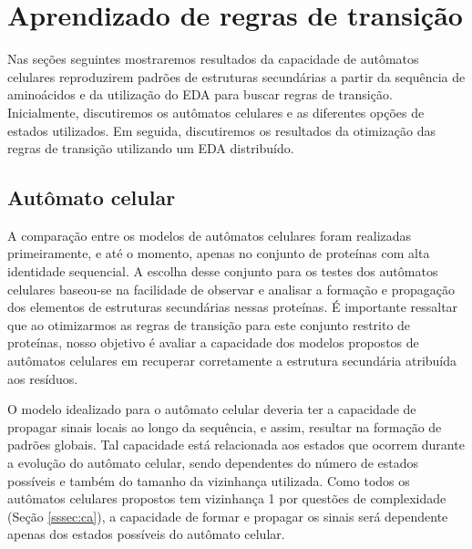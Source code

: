 \chapter{Aprendizado de regras de transição}

Nas seções seguintes mostraremos resultados da capacidade de autômatos celulares reproduzirem padrões de estruturas secundárias a partir da sequência de aminoácidos e da utilização do EDA para buscar regras de transição. Inicialmente, discutiremos os autômatos celulares e as diferentes opções de estados utilizados. Em seguida, discutiremos os resultados da otimização das regras de transição utilizando um EDA distribuído.  


\section{Autômato celular}

A comparação entre os modelos de autômatos celulares foram realizadas primeiramente, e até o momento, apenas no conjunto de proteínas com alta identidade sequencial. A escolha desse conjunto para os testes dos autômatos celulares baseou-se na facilidade de observar e analisar a formação e propagação dos elementos de estruturas secundárias nessas proteínas. É importante ressaltar que ao otimizarmos as regras de transição para este conjunto restrito de proteínas, nosso objetivo é avaliar a capacidade dos modelos propostos de autômatos celulares em recuperar corretamente a estrutura secundária atribuída aos resíduos.   

O modelo idealizado para o autômato celular deveria ter a capacidade de propagar sinais locais ao longo da sequência, e assim, resultar na formação de padrões globais. Tal capacidade está relacionada aos estados que ocorrem durante a evolução do autômato celular, sendo dependentes do número de estados possíveis e também do tamanho da vizinhança utilizada. Como todos os autômatos celulares propostos tem vizinhança 1 por questões de complexidade (Seção \ref{sssec:ca}), a capacidade de formar e propagar os sinais será dependente apenas dos estados possíveis do autômato celular.

